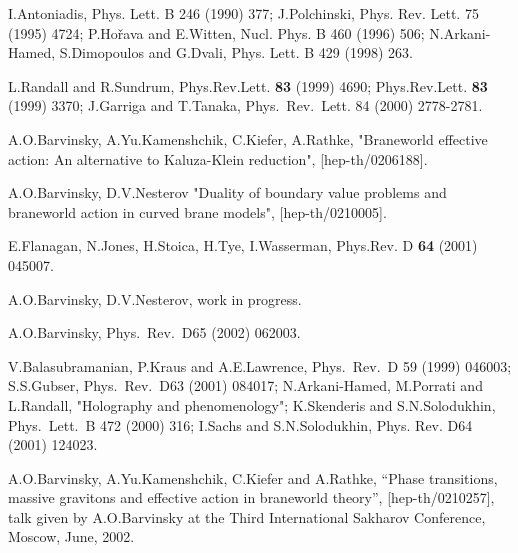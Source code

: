 \documentclass[a4paper,12pt]{article}
\begin{document}
\begin{thebibliography}{99}
I.Antoniadis,
 Phys. Lett. B {246} (1990) 377;
J.Polchinski,
 Phys. Rev. Lett.  {75} (1995) 4724;
P.Ho\v{r}ava and E.Witten,
 Nucl. Phys. B {460} (1996) 506;
N.Arkani-Hamed, S.Dimopoulos and G.Dvali,
 Phys.\myHighlight{$\!$}\coordHE{} Lett.\myHighlight{$\!$}\coordHE{} B\myHighlight{$\!$}\coordHE{} {429}\myHighlight{$\!$}\coordHE{} (1998)\myHighlight{$\!$}\coordHE{} 263.

 L.Randall and R.Sundrum, Phys.Rev.Lett. {\bf 83} (1999)
 4690;
 Phys.Rev.Lett. {\bf 83} (1999) 3370;  J.Garriga and T.Tanaka,
 Phys.\ Rev.\ Lett. 84 (2000) 2778-2781.


 A.O.Barvinsky, A.Yu.Kamenshchik, C.Kiefer, A.Rathke,
"Braneworld effective action: An alternative to Kaluza-Klein
reduction", [hep-th/0206188].

 A.O.Barvinsky, D.V.Nesterov "Duality of boundary
value problems and braneworld action
in curved brane models", [hep-th/0210005].

\fi

 E.Flanagan, N.Jones, H.Stoica, H.Tye, I.Wasserman,
 Phys.Rev. D {\bf 64} (2001) 045007.

 A.O.Barvinsky, D.V.Nesterov, work in progress.

A.O.Barvinsky,
 Phys.\ Rev.\ D{65} (2002) 062003.

\fi


V.Balasubramanian, P.Kraus and A.E.Lawrence,
 Phys.\ Rev.\ D {59} (1999) 046003;
S.S.Gubser,
 Phys.\ Rev.\ D{63} (2001) 084017;
N.Arkani-Hamed, M.Porrati and L.Randall,
 "Holography and phenomenology";
 K.Skenderis and S.N.Solodukhin,
 Phys.\ Lett.\ B {472} (2000) 316;
 I.Sachs and S.N.Solodukhin,
 Phys. Rev. D{64} (2001) 124023.

A.O.Barvinsky, A.Yu.Kamenshchik, C.Kiefer
and A.Rathke, ``Phase transitions, massive gravitons and effective
action in braneworld theory'', [hep-th/0210257], talk given by
A.O.Barvinsky at the Third International Sakharov Conference,
Moscow, June, 2002.

\end{thebibliography}
\end{document}
